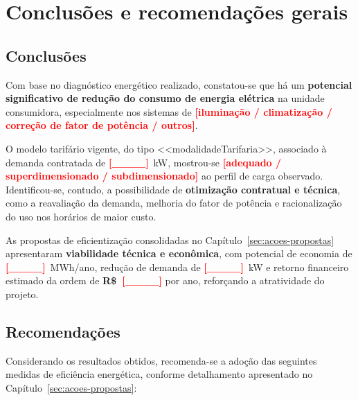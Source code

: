 \chapter{Conclusões e recomendações gerais}


\section{Conclusões}

Com base no diagnóstico energético realizado, constatou-se que há um \textbf{potencial significativo de redução do consumo de energia elétrica} na unidade consumidora, especialmente nos sistemas de \textbf{\textcolor{red}{[iluminação / climatização / correção de fator de potência / outros]}}.

O modelo tarifário vigente, do tipo <<modalidadeTarifaria>>, associado à demanda contratada de \textbf{\textcolor{red}{[\_\_\_\_]}}~kW, mostrou-se \textbf{\textcolor{red}{[adequado / superdimensionado / subdimensionado]}} ao perfil de carga observado. Identificou-se, contudo, a possibilidade de \textbf{otimização contratual e técnica}, como a reavaliação da demanda, melhoria do fator de potência e racionalização do uso nos horários de maior custo.

As propostas de eficientização consolidadas no Capítulo~\ref{sec:acoes-propostas} apresentaram \textbf{viabilidade técnica e econômica}, com potencial de economia de \textbf{\textcolor{red}{[\_\_\_\_]}}~MWh/ano, redução de demanda de \textbf{\textcolor{red}{[\_\_\_\_]}}~kW e retorno financeiro estimado da ordem de \textbf{R\$~\textcolor{red}{[\_\_\_\_]}} por ano, reforçando a atratividade do projeto.

\section{Recomendações}

Considerando os resultados obtidos, recomenda-se a adoção das seguintes medidas de eficiência energética, conforme detalhamento apresentado no Capítulo~\ref{sec:acoes-propostas}:

